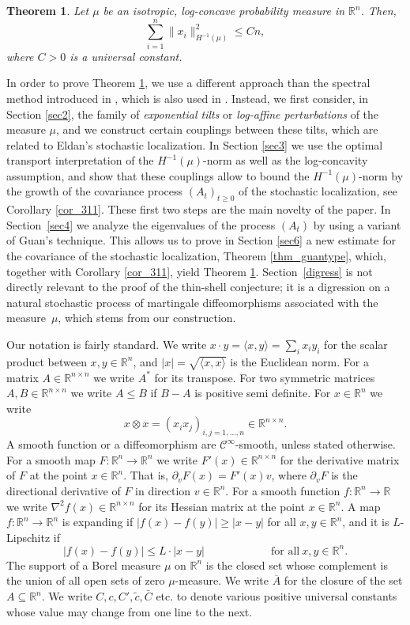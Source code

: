 \documentclass[12pt,a4paper]{article}
\newcommand{\RR}{\mathbb{R}}
\renewcommand{\tilde}{\widetilde}
\newtheorem{theorem}{Theorem}[section]
\theoremstyle{definition}
\begin{document}
\begin{theorem} Let $\mu$ be an isotropic, log-concave probability measure in $\RR^n$. Then,
	$$ \sum_{i=1}^n \| x_i \|^2_{H^{-1}(\mu)} \leq C n, $$
where $C > 0$ is a universal constant.	\label{thm2}
\end{theorem}

In order to prove Theorem \ref{thm2}, we use a different approach than 
the spectral method introduced in \cite{KL}, which is also used in \cite{JLV,guan}. Instead, we first consider, in Section \ref{sec2}, 
the family of {\it exponential tilts} or 
{\it log-affine perturbations} of the measure $\mu$, 
and we construct certain couplings between these tilts, 
which are related to Eldan's stochastic localization. 
In Section \ref{sec3} we use the optimal transport interpretation
of the $H^{-1}(\mu)$-norm as well as the log-concavity assumption, and show that these couplings allow to bound the $H^{-1}(\mu)$-norm
by the growth of the covariance process $(A_t)_{t \geq 0}$ of the stochastic localization, see Corollary \ref{cor_311}. These first two steps are the main 
novelty of the paper. 
In Section~\ref{sec4} we analyze the eigenvalues of the process $(A_t)$ by using a variant of Guan's technique. This allows us to prove in Section
 \ref{sec6} a new estimate for the covariance of the stochastic localization, Theorem \ref{thm_guantype}, 
 which, together with Corollary \ref{cor_311}, yield Theorem \ref{thm2}. 
Section~\ref{digress} is not directly relevant to the proof of the thin-shell conjecture; it is a digression on a natural stochastic process of martingale diffeomorphisms associated with the measure~$\mu$, which stems from our construction.


\medskip Our notation is fairly standard. We write $x \cdot y = \langle x, y \rangle = \sum_i x_i y_i$ for the
scalar product between $x,y \in \RR^n$, and $|x| = \sqrt{\langle x, x \rangle}$ is the Euclidean norm.
For a matrix $A \in \RR^{n \times n}$ we write $A^*$ for its transpose.
For two symmetric matrices $A, B \in \RR^{n \times n}$ we write $A \leq B$ if $B-A$ is positive
semi definite.
For $x \in \RR^n$ we write $$ x \otimes x = (x_i x_j)_{i,j=1,\ldots,n} \in \RR^{n \times n}. $$
A smooth function or a diffeomorphism are  $\mathcal C^{\infty}$-smooth, unless stated otherwise.
For a smooth map $F: \RR^n \rightarrow \RR^n$ we write $F'(x) \in \RR^{n \times n}$ for the derivative matrix of $F$ at the point $x \in \RR^n$. That is,
$\partial_v F(x) = F'(x) v$, where $\partial_v F$ is the directional derivative of $F$ in direction $v \in \RR^n$.
For a smooth function $f: \RR^n \rightarrow \RR$ we write $\nabla^2 f(x) \in \RR^{n \times n}$
for its Hessian matrix at the point $x \in \RR^n$. A map $f: \RR^n \rightarrow \RR^n$
is expanding if $|f(x) - f(y)| \geq |x-y|$ for all $x,y \in \RR^n$, and it is $L$-Lipschitz
if $$ |f(x) - f(y)| \leq L \cdot |x-y| \qquad \qquad \qquad \textrm{for all} \ x,y \in \RR^n. $$
The support of a Borel measure $\mu$ on $\RR^n$ is the closed set whose complement is the union of all open sets of zero $\mu$-measure.
We write $\overline{A}$ for the closure of the set $A \subseteq \RR^n$.
We write $C, c, C', \tilde{c}, \bar{C}$ etc. to denote various positive universal constants whose value may change from one line to the next.
\end{document}
